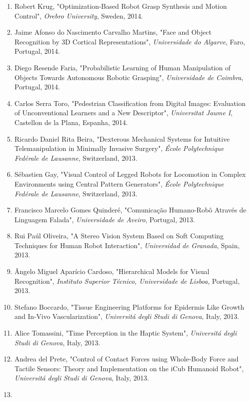 \documentclass[
]{article}
\begin{document}
\begin{enumerate}
{  III de Madrid}, Espanha, 2014.
\item
  Robert Krug, "Optimization-Based Robot Grasp Synthesis and Motion
  Control", \emph{Orebro University}, Sweden, 2014.
\item
  Jaime Afonso do Nascimento Carvalho Martins, "Face and Object
  Recognition by 3D Cortical Representations", \emph{Universidade do
  Algarve}, Faro, Portugal, 2014.
\item
  Diego Resende Faria, "Probabilistic Learning of Human Manipulation of
  Objects Towards Autonomous Robotic Grasping", \emph{Universidade de
  Coimbra}, Portugal, 2014.
\item
  Carlos Serra Toro, "Pedestrian Classification from Digital Images:
  Evaluation of Unconventional Learners and a New Descriptor",
  \emph{Universitat Jaume I}, Castellon de la Plana, Espanha, 2014.
\item
  Ricardo Daniel Rita Beira, "Dexterous Mechanical Systems for Intuitive
  Telemanipulation in Minimally Invasive Surgery", \emph{École
  Polytechnique Fedérale de Lausanne}, Switzerland, 2013.
\item
  Sébastien Gay, "Visual Control of Legged Robots for Locomotion in
  Complex Environments using Central Pattern Generators", \emph{École
  Polytechnique Fedérale de Lausanne}, Switzerland, 2013.
\item
  Francisco Marcelo Gomes Quinderé, "Comunicação Humano-Robô Através de
  Linguagem Falada", \emph{Universidade de Aveiro}, Portugal, 2013.
\item
  Rui Paúl Oliveira, "A Stereo Vision System Based on Soft Computing
  Techniques for Human Robot Interaction", \emph{Universidad de
  Granada}, Spain, 2013.
\item
  Ângelo Miguel Aparício Cardoso, "Hierarchical Models for Visual
  Recognition", \emph{Instituto Superior Técnico, Universidade de
  Lisboa}, Portugal, 2013.
\item
  Stefano Boccardo, "Tissue Engineering Platforms for Epidermis Like
  Growth and In-Vivo Vascularization", \emph{Universitá degli Studi di
  Genova}, Italy, 2013.
\item
  Alice Tomassini, "Time Perception in the Haptic System",
  \emph{Universitá degli Studi di Genova}, Italy, 2013.
\item
  Andrea del Prete, "Control of Contact Forces using Whole-Body Force
  and Tactile Sensors: Theory and Implementation on the iCub Humanoid
  Robot", \emph{Universitá degli Studi di Genova}, Italy, 2013.
\item

\end{enumerate}
\end{document}

